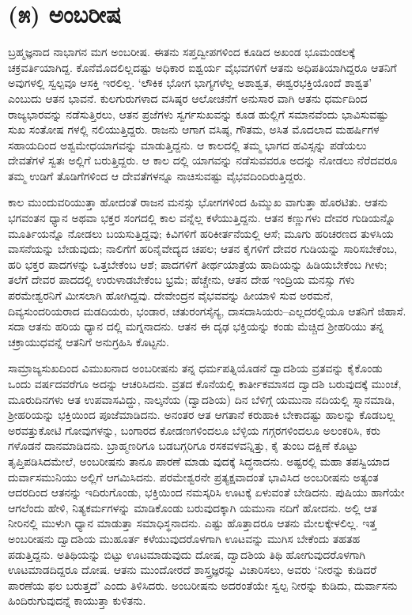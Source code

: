 \section{(೫) ಅಂಬರೀಷ}

ಬ್ರಹ್ಮಜ್ಞನಾದ ನಾಭಾಗನ ಮಗ ಅಂಬರೀಷ. ಈತನು ಸಪ್ತದ್ವೀಪಗಳಿಂದ ಕೂಡಿದ ಅಖಂಡ ಭೂಮಂಡಲಕ್ಕೆ ಚಕ್ರವರ್ತಿಯಾಗಿದ್ದ. ಕೊನೆಮೊದಲಿಲ್ಲದಷ್ಟು ಅಧಿಕಾರ ಐಶ್ವರ್ಯ ವೈಭವಗಳಿಗೆ ಆತನು ಅಧಿಪತಿಯಾಗಿದ್ದರೂ ಆತನಿಗೆ ಅವುಗಳಲ್ಲಿ ಸ್ವಲ್ಪವೂ ಆಸಕ್ತಿ ಇರಲಿಲ್ಲ. ‘ಲೌಕಿಕ ಭೋಗ ಭಾಗ್ಯಗಳೆಲ್ಲ ಅಶಾಶ್ವತ, ಈಶ್ವರಭಕ್ತಿಯೊಂದೆ ಶಾಶ್ವತ’ ಎಂಬುದು ಆತನ ಭಾವನೆ. ಕುಲಗುರುಗಳಾದ ವಸಿಷ್ಠರ ಆಲೋಚನೆಗೆ ಅನುಸಾರ ವಾಗಿ ಆತನು ಧರ್ಮದಿಂದ ರಾಜ್ಯಭಾರವನ್ನು ನಡೆಸುತ್ತಿರಲು, ಆತನ ಪ್ರಜೆಗಳು ಸ್ವರ್ಗಸುಖವನ್ನು ಕೂಡ ಹುಲ್ಲಿಗೆ ಸಮಾನವೆಂದು ಭಾವಿಸುವಷ್ಟು ಸುಖ ಸಂತೋಷ ಗಳಲ್ಲಿ ನಲಿಯುತ್ತಿದ್ದರು. ರಾಜನು ಆಗಾಗ ವಸಿಷ್ಠ, ಗೌತಮ, ಅಸಿತ ಮೊದಲಾದ ಮಹರ್ಷಿಗಳ ಸಹಾಯದಿಂದ ಅಶ್ವಮೇಧಯಾಗವನ್ನು ಮಾಡುತ್ತಿದ್ದನು. ಆ ಕಾಲದಲ್ಲಿ ತಮ್ಮ ಭಾಗದ ಹವಿಸ್ಸನ್ನು ಪಡೆಯಲು ದೇವತೆಗಳೆ ಸ್ವತಃ ಅಲ್ಲಿಗೆ ಬರುತ್ತಿದ್ದರು. ಆ ಕಾಲ ದಲ್ಲಿ ಯಾಗವನ್ನು ನಡೆಸುವವರೂ ಅದನ್ನು ನೋಡಲು ನೆರೆದವರೂ ತಮ್ಮ ಉಡಿಗೆ ತೊಡಿಗೆಗಳಿಂದ ಆ ದೇವತೆಗಳನ್ನೂ ನಾಚಿಸುವಷ್ಟು ವೈಭವದಿಂದಿರುತ್ತಿದ್ದರು.

ಕಾಲ ಮುಂದುವರಿಯುತ್ತಾ ಹೋದಂತೆ ರಾಜನ ಮನಸ್ಸು ಭೋಗಗಳಿಂದ ಹಿಮ್ಮುಖ ವಾಗುತ್ತಾ ಹೊರಟಿತು. ಆತನು ಭಗವಂತನ ಧ್ಯಾನ ಅಥವಾ ಭಕ್ತರ ಸಂಗದಲ್ಲಿ ಕಾಲ ವನ್ನೆಲ್ಲ ಕಳೆಯುತ್ತಿದ್ದನು. ಆತನ ಕಣ್ಣುಗಳು ದೇವರ ಗುಡಿಯನ್ನೊ ಮೂರ್ತಿಯನ್ನೊ ನೋಡಲು ಬಯಸುತ್ತಿದ್ದವು; ಕಿವಿಗಳಿಗೆ ಹರಿಕೀರ್ತನೆಯಲ್ಲಿ ಆಸೆ; ಮೂಗು ಹರಿಚರಣದ ತುಳಸಿಯ ವಾಸನೆಯನ್ನು ಬೇಡುವುದು; ನಾಲಿಗೆಗೆ ಹರಿನೈವೇದ್ಯದ ಚಪಲ; ಆತನ ಕೈಗಳಿಗೆ ದೇವರ ಗುಡಿಯನ್ನು ಸಾರಿಸಬೇಕೆಂಬ, ಹರಿ ಭಕ್ತರ ಪಾದಗಳನ್ನು ಒತ್ತಬೇಕೆಂಬ ಆಶೆ; ಪಾದಗಳಿಗೆ ತೀರ್ಥಯಾತ್ರೆಯ ಹಾದಿಯನ್ನು ಹಿಡಿಯಬೇಕೆಂಬ ಗೀಳು; ತಲೆಗೆ ದೇವರ ಪಾದದಲ್ಲಿ ಉರುಳಾಡಬೇಕೆಂಬ ಭ್ರಮೆ; ಹೆಚ್ಚೇನು, ಆತನ ದೇಹ ಇಂದ್ರಿಯ ಮನಸ್ಸು ಗಳು ಪರಮೇಶ್ವರನಿಗೆ ಮೀಸಲಾಗಿ ಹೋಗಿದ್ದವು. ದೇವೇಂದ್ರನ ವೈಭವವನ್ನು ಹೀಯಾಳಿ ಸುವ ಅರಮನೆ, ದಿವ್ಯಸುಂದರಿಯರಾದ ಮಡದಿಯರು, ಭಂಡಾರ, ಚತುರಂಗಸೈನ್ಯ, ದಾಸದಾಸಿಯರು–ಎಲ್ಲದರಲ್ಲಿಯೂ ಆತನಿಗೆ ಜಿಹಾಸೆ. ಸದಾ ಆತನು ಹರಿಯ ಧ್ಯಾನ ದಲ್ಲಿ ಮಗ್ನನಾದನು. ಆತನ ಈ ದೃಢ ಭಕ್ತಿಯನ್ನು ಕಂಡು ಮೆಚ್ಚಿದ ಶ್ರೀಹರಿಯು ತನ್ನ ಚಕ್ರಾಯುಧವನ್ನೆ ಆತನಿಗೆ ಅನುಗ್ರಹಿಸಿ ಕೊಟ್ಟನು.

ಸಾಮ್ರಾಜ್ಯಸುಖದಿಂದ ವಿಮುಖನಾದ ಅಂಬರೀಷನು ತನ್ನ ಧರ್ಮಪತ್ನಿಯೊಡನೆ ದ್ವಾದಶಿಯ ವ್ರತವನ್ನು ಕೈಕೊಂಡು ಒಂದು ವರ್ಷದವರೆಗೂ ಅದನ್ನು ಆಚರಿಸಿದನು. ವ್ರತದ ಕೊನೆಯಲ್ಲಿ ಕಾರ್ತೀಕಮಾಸದ ದ್ವಾದಶಿ ಬರುವುದಕ್ಕೆ ಮುಂಚೆ, ಮೂರುದಿನಗಳು ಆತ ಉಪವಾಸವಿದ್ದು, ನಾಲ್ಕನೆಯ (ದ್ವಾದಶಿಯ) ದಿನ ಬೆಳಿಗ್ಗೆ ಯಮುನಾ ನದಿಯಲ್ಲಿ ಸ್ನಾನಮಾಡಿ, ಶ್ರೀಹರಿಯನ್ನು ಭಕ್ತಿಯಿಂದ ಪೂಜೆಮಾಡಿದನು. ಅನಂತರ ಆತ ಆಗತಾನೆ ಕರುಹಾಕಿ ಬೇಕಾದಷ್ಟು ಹಾಲನ್ನು ಕೊಡಬಲ್ಲ ಅರವತ್ತುಕೋಟಿ ಗೋವುಗಳನ್ನು, ಬಂಗಾರದ ಕೋಡಣಗಳಿಂದಲೂ ಬೆಳ್ಳಿಯ ಗಗ್ಗರಗಳಿಂದಲೂ ಅಲಂಕರಿಸಿ, ಕರು ಗಳೊಡನೆ ದಾನಮಾಡಿದನು. ಬ್ರಾಹ್ಮಣರಿಗೂ ಬಡಬಗ್ಗರಿಗೂ ರಸಕವಳವನ್ನಿತ್ತು, ಕೈ ತುಂಬ ದಕ್ಷಿಣೆ ಕೊಟ್ಟು ತೃಪ್ತಿಪಡಿಸಿದಮೇಲೆ, ಅಂಬರೀಷನು ತಾನೂ ಪಾರಣೆ ಮಾಡು ವುದಕ್ಕೆ ಸಿದ್ಧನಾದನು. ಅಷ್ಟರಲ್ಲಿ ಮಹಾ ತಪಸ್ವಿಯಾದ ದುರ್ವಾಸಮುನಿಯು ಅಲ್ಲಿಗೆ ಆಗಮಿಸಿದನು. ಪರಮೇಶ್ವರನೇ ಪ್ರತ್ಯಕ್ಷವಾದಂತೆ ಭಾವಿಸಿದ ಅಂಬರೀಷನು ಅತ್ಯಂತ ಆದರದಿಂದ ಆತನನ್ನು ಇದಿರುಗೊಂಡು, ಭಕ್ತಿಯಿಂದ ನಮಸ್ಕರಿಸಿ ಊಟಕ್ಕೆ ಏಳುವಂತೆ ಬೇಡಿದನು. ಪುಷಿಯು ಹಾಗೆಯೇ ಆಗಲೆಂದು ಹೇಳಿ, ನಿತ್ಯಕರ್ಮಗಳನ್ನು ಮಾಡಿಕೊಂಡು ಬರುವುದಕ್ಕಾಗಿ ಯಮುನಾ ನದಿಗೆ ಹೋದನು. ಅಲ್ಲಿ ಆತ ನೀರಿನಲ್ಲಿ ಮುಳುಗಿ ಧ್ಯಾನ ಮಾಡುತ್ತಾ ಸಮಾಧಿಸ್ಥನಾದನು. ಎಷ್ಟು ಹೊತ್ತಾದರೂ ಆತನು ಮೇಲಕ್ಕೇಳಲಿಲ್ಲ. ಇತ್ತ ಅಂಬರೀಷನು ದ್ವಾದಶಿಯ ಮುಹೂರ್ತ ಕಳೆಯುವುದರೊಳಗಾಗಿ ಊಟವನ್ನು ಮುಗಿಸ ಬೇಕೆಂದು ತಹತಹ ಪಡುತ್ತಿದ್ದನು. ಅತಿಥಿಯನ್ನು ಬಿಟ್ಟು ಊಟಮಾಡುವುದು ದೋಷ, ದ್ವಾದಶಿಯ ತಿಥಿ ಹೋಗುವುದರೊಳಗಾಗಿ ಊಟಮಾಡದಿದ್ದರೂ ದೋಷ. ಆತನು ಮುಂದೋರದೆ ಶಾಸ್ತ್ರಜ್ಞರನ್ನು ವಿಚಾರಿಸಲು, ಅವರು ‘ನೀರನ್ನು ಕುಡಿದರೆ ಪಾರಣೆಯ ಫಲ ಬರುತ್ತದೆ’ ಎಂದು ತಿಳಿಸಿದರು. ಅಂಬರೀಷನು ಅದರಂತೆಯೇ ಸ್ವಲ್ಪ ನೀರನ್ನು ಕುಡಿದು, ದುರ್ವಾಸನು ಹಿಂದಿರುಗುವುದನ್ನೆ ಕಾಯುತ್ತಾ ಕುಳಿತನು.

